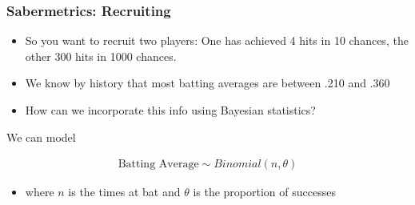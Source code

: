 \documentclass[
  shownotes,
  xcolor={svgnames},
  hyperref={colorlinks,citecolor=DarkBlue,linkcolor=DarkRed,urlcolor=DarkBlue}
  ]{beamer}
\begin{document}
\begin{frame}[fragile]
\frametitle{Sabermetrics: Recruiting}
\begin{itemize}
\item So you want to recruit two players: One has achieved 4 hits in 10 chances, the other 300 hits in 1000 chances.
\medskip
\item We know by history that most batting averages are between .210 and .360 
\medskip
\item How can we incorporate this info using Bayesian statistics?
\end{itemize}

We can model

\begin{align}
\text{Batting Average} \sim Binomial(n,\theta)
\end{align}

\begin{itemize}
\item where $n$ is the times at bat and $\theta$ is the proportion of successes
\end{itemize}

\end{frame}
\end{document}
